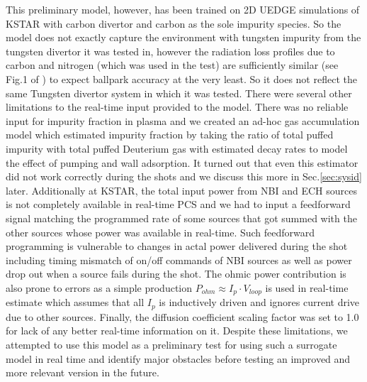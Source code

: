 This preliminary model, however, has been trained on 2D UEDGE simulations of KSTAR with carbon divertor and carbon as the sole impurity species.
So the model does not exactly capture the environment with tungsten impurity from the tungsten divertor it was tested in, however the radiation loss profiles due to carbon and nitrogen (which was used in the test) are sufficiently similar (see Fig.1 of \cite{kallenbach_2013_ppcf}) to expect ballpark accuracy at the very least.
So it does not reflect the same Tungsten divertor system in which it was tested.
There were several other limitations to the real-time input provided to the model.
There was no reliable input for impurity fraction in plasma and we created an ad-hoc gas accumulation model which estimated impurity fraction by taking the ratio of total puffed impurity with total puffed Deuterium gas with estimated decay rates to model the effect of pumping and wall adsorption.
It turned out that even this estimator did not work correctly during the shots and we discuss this more in Sec.\ref{sec:sysid} later.
Additionally at KSTAR, the total input power from NBI and ECH sources is not completely available in real-time PCS and we had to input a feedforward signal matching the programmed rate of some sources that got summed with the other sources whose power was available in real-time.
Such feedforward programming is vulnerable to changes in actal power delivered during the shot including timing mismatch of on/off commands of NBI sources as well as power drop out when a source fails during the shot.
The ohmic power contribution is also prone to errors as a simple production $P_{ohm} \approx I_p \cdot V_{loop}$ is used in real-time estimate which assumes that all $I_p$ is inductively driven and ignores current drive due to other sources.
Finally, the diffusion coefficient scaling factor was set to 1.0 for lack of any better real-time information on it.
Despite these limitations, we attempted to use this model as a preliminary test for using such a surrogate model in real time and identify major obstacles before testing an improved and more relevant version in the future.

